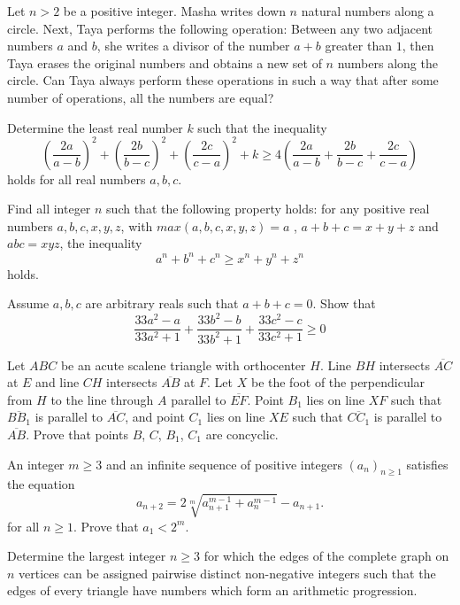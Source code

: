 \documentclass[11pt]{scrartcl}
\begin{document}
\begin{problem}[989812634983805]
Let $n>2$ be a positive integer. Masha writes down $n$ natural numbers along a circle. Next, Taya performs the following operation: Between any two adjacent numbers $a$ and $b$, she writes a divisor of the number $a+b$ greater than $1$, then Taya erases the original numbers and obtains a new set of $n$ numbers along the circle. Can Taya always perform these operations in such a way that after some number of operations, all the numbers are equal?
\end{problem}
\begin{problem}[996551176989879]
	Determine the least real number $k$ such that the inequality
$$\left(\frac{2a}{a-b}\right)^2+\left(\frac{2b}{b-c}\right)^2+\left(\frac{2c}{c-a}\right)^2+k \geq 4\left(\frac{2a}{a-b}+\frac{2b}{b-c}+\frac{2c}{c-a}\right)$$holds for all real numbers $a,b,c$.
\end{problem}
\begin{problem}[998599217742496]
Find all integer $n$ such that the following property holds: for any positive real numbers $a,b,c,x,y,z$, with $max(a,b,c,x,y,z)=a$ , $a+b+c=x+y+z$ and $abc=xyz$, the inequality$$a^n+b^n+c^n \ge x^n+y^n+z^n$$holds.
\end{problem}
\begin{problem}[4791181672152854]
Assume $ a,b,c $ are arbitrary reals such that $ a+b+c = 0 $. Show that$$ \frac{33a^2-a}{33a^2+1}+\frac{33b^2-b}{33b^2+1}+\frac{33c^2-c}{33c^2+1} \ge 0 $$
\end{problem}
\begin{problem}[15595788767204175]
Let \(ABC\) be an acute scalene triangle with orthocenter \(H\). Line \(BH\) intersects \(\overline{AC}\) at \(E\) and line \(CH\) intersects \(\overline{AB}\) at \(F\). Let \(X\) be the foot of the perpendicular from \(H\) to the line through \(A\) parallel to \(\overline{EF}\). Point \(B_1\) lies on line \(XF\) such that \(\overline{BB_1}\) is parallel to \(\overline{AC}\), and point \(C_1\) lies on line \(XE\) such that \(\overline{CC_1}\) is parallel to \(\overline{AB}\). Prove that points \(B\), \(C\), \(B_1\), \(C_1\) are concyclic.
\end{problem}
\begin{problem}[70860160786125918]
An integer $m\ge 3$ and an infinite sequence of positive integers $(a_n)_{n\ge 1}$ satisfies the equation
\[a_{n+2} = 2\sqrt[m]{a_{n+1}^{m-1} + a_n^{m-1}} - a_{n+1}. \]for all $n\ge 1$. Prove that $a_1 < 2^m$.
\end{problem}
\begin{problem}[84404352934565744]
Determine the largest integer $n\geq 3$ for which the edges of the complete graph on $n$ vertices
can be assigned pairwise distinct non-negative integers such that the edges of every triangle have numbers which form an arithmetic progression.
\end{problem}
\end{document}
